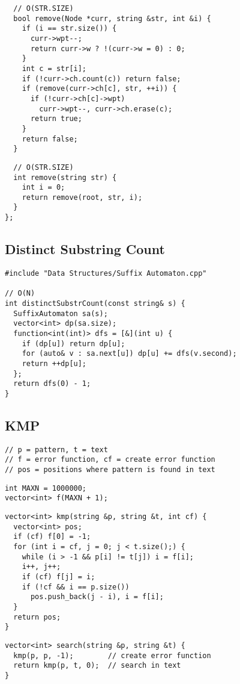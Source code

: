 \documentclass[twoside]{article}
\newcommand{\fileTitleStyle}{\large\underline}
\begin{document}
\begin{multicols*}{2}
\begin{verbatim}
  // O(STR.SIZE)
  bool remove(Node *curr, string &str, int &i) {
    if (i == str.size()) {
      curr->wpt--;
      return curr->w ? !(curr->w = 0) : 0;
    }
    int c = str[i];
    if (!curr->ch.count(c)) return false;
    if (remove(curr->ch[c], str, ++i)) {
      if (!curr->ch[c]->wpt)
        curr->wpt--, curr->ch.erase(c);
      return true;
    }
    return false;
  }
\end{verbatim}
\vspace{-12pt}
\begin{verbatim}
  // O(STR.SIZE)
  int remove(string str) {
    int i = 0;
    return remove(root, str, i);
  }
};
\end{verbatim}

\subsectionfont{\centering\bfseries\LARGE}
\subsectionfont{\fileTitleStyle}
\subsection*{Distinct Substring Count}
\begin{verbatim}
#include "Data Structures/Suffix Automaton.cpp"

// O(N)
int distinctSubstrCount(const string& s) {
  SuffixAutomaton sa(s);
  vector<int> dp(sa.size);
  function<int(int)> dfs = [&](int u) {
    if (dp[u]) return dp[u];
    for (auto& v : sa.next[u]) dp[u] += dfs(v.second);
    return ++dp[u];
  };
  return dfs(0) - 1;
}
\end{verbatim}

\subsectionfont{\centering\bfseries\LARGE}
\subsectionfont{\fileTitleStyle}
\subsection*{KMP}
\begin{verbatim}
// p = pattern, t = text
// f = error function, cf = create error function
// pos = positions where pattern is found in text
\end{verbatim}
\vspace{-12pt}
\begin{verbatim}
int MAXN = 1000000;
vector<int> f(MAXN + 1);
\end{verbatim}
\vspace{-12pt}
\begin{verbatim}
vector<int> kmp(string &p, string &t, int cf) {
  vector<int> pos;
  if (cf) f[0] = -1;
  for (int i = cf, j = 0; j < t.size();) {
    while (i > -1 && p[i] != t[j]) i = f[i];
    i++, j++;
    if (cf) f[j] = i;
    if (!cf && i == p.size())
      pos.push_back(j - i), i = f[i];
  }
  return pos;
}
\end{verbatim}
\vspace{-12pt}
\begin{verbatim}
vector<int> search(string &p, string &t) {
  kmp(p, p, -1);        // create error function
  return kmp(p, t, 0);  // search in text
}
\end{verbatim}


\end{multicols*}
\end{document}
